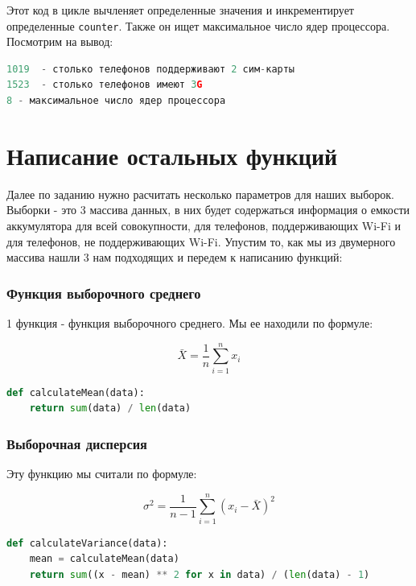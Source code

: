 \documentclass[14pt]{extreport}
\begin{document}
Этот код в цикле вычленяет определенные значения и инкрементирует определенные 
\texttt{counter}. Также он ищет максимальное число ядер процессора. Посмотрим на вывод:


\begin{lstlisting}[language=Python, caption={Вывод для первых трех вопросов}]
1019  - столько телефонов поддерживают 2 сим-карты
1523  - столько телефонов имеют 3G
8 - максимальное число ядер процессора
\end{lstlisting}


\section{Написание остальных функций}

Далее по заданию нужно расчитать несколько параметров для наших выборок.
Выборки - это 3 массива данных, в них будет содержаться информация о емкости
аккумулятора для всей совокупности, для телефонов, поддерживающих Wi-Fi и для
телефонов, не поддерживающих Wi-Fi.
Упустим то, как мы из двумерного массива нашли 3 нам подходящих и передем к написанию функций:\\

\subsubsection{Функция выборочного среднего}
1 функция - функция выборочного среднего. Мы ее находили по формуле:

\[
\bar{X} = \frac{1}{n} \sum_{i=1}^{n} x_i
\]

\begin{lstlisting}[language=Python, caption={Функция поиска выборочного среднего}]
def calculateMean(data):
    return sum(data) / len(data)
\end{lstlisting}



\subsubsection{Выборочная дисперсия}
Эту функцию мы считали по формуле:

\[
\sigma^2 = \frac{1}{n-1} \sum_{i=1}^{n} (x_i - \bar{X})^2
\]

\begin{lstlisting}[language=Python, caption={Функция поиска выборочной дисперсии}]
def calculateVariance(data):
    mean = calculateMean(data)
    return sum((x - mean) ** 2 for x in data) / (len(data) - 1)
\end{lstlisting}
\end{document}
